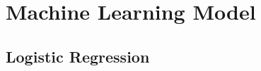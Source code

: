 % 		
		
	
	
	
\newpage
\section{Machine Learning Model} 
\label{sec:machine_model}
	
\subsection{Logistic Regression}
\label{subsec:logistic_regression}
